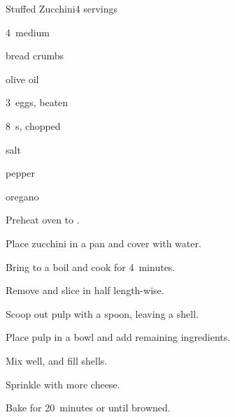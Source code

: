 \begin{recipe}{Stuffed Zucchini}{}{4 servings}

\begin{ingredients}
\item 4~medium 
\item \C{\half} bread crumbs
\item {} olive oil
\item 3~eggs, beaten
\item \C{\half} 
\item 8~s, chopped
\item salt
\item pepper
\item oregano
\end{ingredients}

\begin{directions}
\item Preheat oven to .
\item Place zucchini in a pan and cover with water.
\item Bring to a boil and cook for 4~minutes.
\item Remove and slice in half length-wise.
\item Scoop out pulp with a spoon, leaving a shell.
\item Place pulp in a bowl and add remaining ingredients.
\item Mix well, and fill shells.
\item Sprinkle with more cheese.
\item Bake for 20~minutes or until browned.
\end{directions}

\hint{}
\end{recipe}
